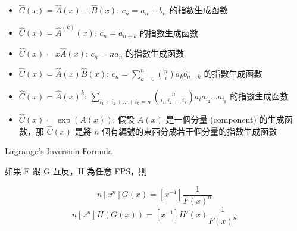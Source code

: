 \begin{itemize}
    \item $\hat C(x) = \hat A(x) + \hat B(x)$: $c_n=a_n+b_n$ 的指數生成函數
    \item $\hat C(x) = \hat A^{(k)}(x)$: $c_n=a_{n+k}$ 的指數生成函數
    \item $\hat C(x) = x\hat A(x)$: $c_n=na_n$ 的指數生成函數
    \item $\hat C(x) = \hat A(x)\hat B(x)$: $c_n=\sum_{k=0}^n \binom{n}{i} a_kb_{n-k}$ 的指數生成函數
    \item $\hat C(x) = \hat A(x)^k$: $\sum\limits_{i_1+i_2+\dots+i_k=n} \binom{n}{i_1,i_2,\dots,i_k}a_ia_{i_2}\dots a_{i_k}$ 的指數生成函數
	\item $\hat C(x) = \exp(A(x))$: 假設 $A(x)$ 是一個分量 (component) 的生成函數，那 $\hat C(x)$ 是將 $n$ 個有編號的東西分成若干個分量的指數生成函數
\end{itemize}

Lagrange's Inversion Formula

如果 F 跟 G 互反，H 為任意 FPS，則

\[ n [x^n] G(x) = [x^{-1}]\frac{1}{F(x)^{n}}\]
\[ n [x^n] H(G(x)) = [x^{-1}] H'(x) \frac{1}{F(x)^{n}}\]
